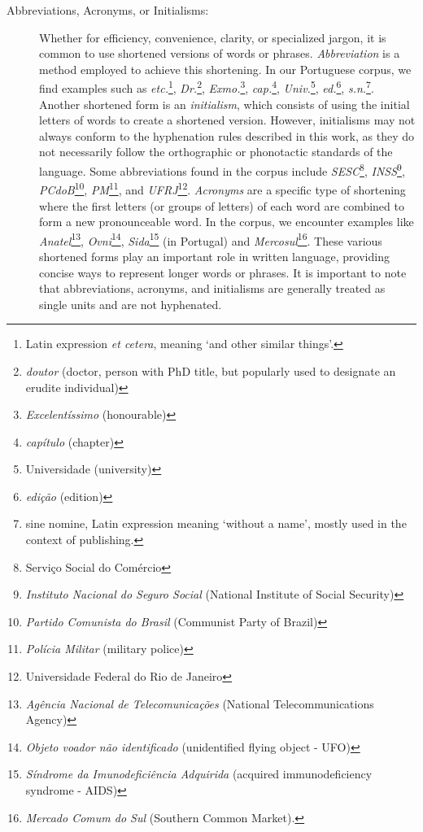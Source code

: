 \begin{description}
    \item[Abbreviations, Acronyms, or Initialisms:\label{abbrev}] 
       Whether for efficiency, convenience, clarity, or specialized jargon, 
       it is common to use shortened versions of words or phrases. \emph{Abbreviation} is 
       a method employed to achieve this shortening. In our Portuguese corpus, we find examples such as 
       \emph{etc.}\footnote{Latin expression \emph{et cetera}, meaning `and other similar things'.}, 
       \emph{Dr.}\footnote{\emph{doutor} (doctor, person with PhD title, but popularly used to designate an erudite individual)}, 
       \emph{Exmo.}\footnote{\emph{Excelentíssimo} (honourable)},
       \emph{cap.}\footnote{\emph{capítulo} (chapter)}, \emph{Univ.}\footnote{Universidade (university)}, 
       \emph{ed.}\footnote{\emph{edição} (edition)}, 
       \emph{s.n.}\footnote{sine nomine, Latin expression meaning `without a name', mostly used in the context of publishing.}.
       Another shortened form is an \emph{initialism}, which consists of using
       the initial letters of words to create a shortened version. However,
       initialisms may not always conform to the hyphenation rules described in
       this work, as they do not necessarily follow the orthographic or
       phonotactic standards of the language. Some abbreviations found in the
       corpus include 
       \emph{SESC}\footnote{Serviço Social do Comércio}, 
       \emph{INSS}\footnote{\emph{Instituto Nacional do Seguro Social} (National Institute of Social Security)}, 
       \emph{PCdoB}\footnote{\emph{Partido Comunista do Brasil} (Communist Party of Brazil)},
       \emph{PM}\footnote{\emph{Polícia Militar} (military police)}, and 
       \emph{UFRJ}\footnote{Universidade Federal do Rio de Janeiro}.
       \emph{Acronyms} are a specific type of shortening where the first letters (or
       groups of letters) of each word are combined to form a new pronounceable
       word. In the corpus, we encounter examples like 
       \emph{Anatel}\footnote{\emph{Agência Nacional de Telecomunicações} (National Telecommunications Agency)},
       \emph{Ovni}\footnote{\emph{Objeto voador não identificado} (unidentified flying object - UFO)},
       \emph{Sida}\footnote{\emph{Síndrome da Imunodeficiência Adquirida} (acquired immunodeficiency syndrome - AIDS)} (in Portugal) and
       \emph{Mercosul}\footnote{\emph{Mercado Comum do Sul} (Southern Common Market).}.
       These various shortened forms play an important role in written
       language, providing concise ways to represent longer words or phrases.
       It is important to note that abbreviations, acronyms, and initialisms
       are generally treated as single units and are not hyphenated.

\end{description}



